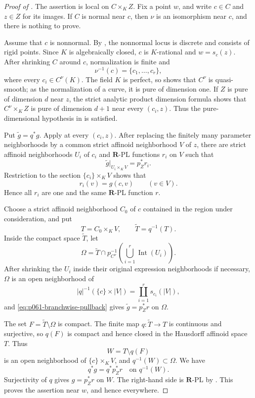 \begin{proof}[Proof of
]
The assertion is local on \(C\times_KZ\).  Fix a point \(w\), and write
\(c\in C\) and \(z\in Z\) for its images.  If \(C\) is normal near
\(c\), then \(\nu\) is an isomorphism near \(c\), and there is nothing
to prove.

Assume that \(c\) is nonnormal.  By
\cite[Lemma~3.9(2)]{GR25Classical}, the nonnormal locus is discrete and
consists of rigid points.  Since \(K\) is algebraically closed, \(c\) is
\(K\)-rational and \(w=s_c(z)\).  After shrinking \(C\) around \(c\),
normalization is finite and
\[
                         \nu^{-1}(c)=\{c_1,\ldots,c_r\},
\]
where every \(c_i\in C^\nu(K)\).
The field \(K\) is perfect, so
\cite[Lemma~3.9(1)]{GR25Classical} shows that \(C^\nu\) is quasi-smooth;
as the normalization of a curve, it is pure of dimension one.  If \(Z\)
is pure of dimension \(d\) near \(z\), the strict analytic product
dimension formula shows that \(C^\nu\times_KZ\) is pure of dimension
\(d+1\) near every \((c_i,z)\).  Thus the pure-dimensional hypothesis in
 is satisfied.

Put \(\widetilde g=q^*g\).  Apply
 at every \((c_i,z)\).  After
replacing the finitely many parameter neighborhoods by a common strict
affinoid neighborhood \(V\) of \(z\), there are strict affinoid
neighborhoods \(U_i\) of \(c_i\) and \(\mathbf R\)-PL functions \(r_i\)
on \(V\) such that
\begin{equation}
\label{eq:p061-branchwise-pullback}
                    \widetilde g|_{U_i\times_KV}=p_Z^*r_i.
\end{equation}
Restriction to the section \(\{c_i\}\times_KV\) shows that
\[
                     r_i(v)=g(c,v)\qquad(v\in V).
\]
Hence all \(r_i\) are one and the same \(\mathbf R\)-PL function \(r\).

Choose a strict affinoid neighborhood \(C_0\) of \(c\) contained in the
region under consideration, and put
\[
 T=C_0\times_KV,\qquad \widetilde T=q^{-1}(T).
\]
Inside the compact space \(\widetilde T\), let
\[
 \Omega=\widetilde T\cap
         p_{C^\nu}^{-1}\!\left(\bigcup_{i=1}^r\operatorname{Int}(U_i)\right).
\]
After shrinking the \(U_i\) inside their original expression
neighborhoods if necessary, \(\Omega\) is an open neighborhood of
\[
 |q|^{-1}(\{c\}\times|V|)
       =\coprod_{i=1}^r s_{c_i}(|V|),
\]
and \eqref{eq:p061-branchwise-pullback} gives
\(\widetilde g=p_Z^*r\) on \(\Omega\).

The set \(F=\widetilde T\setminus\Omega\) is compact.  The finite map
\(q:\widetilde T\to T\) is continuous and surjective, so \(q(F)\) is
compact and hence closed in the Hausdorff affinoid space \(T\).  Thus
\[
                              W=T\setminus q(F)
\]
is an open neighborhood of \(\{c\}\times_KV\), and
\(q^{-1}(W)\subset\Omega\).  We have
\[
                  q^*g=q^*p_Z^*r\quad\text{on }q^{-1}(W).
\]
Surjectivity of \(q\) gives \(g=p_Z^*r\) on \(W\).  The right-hand side
is \(\mathbf R\)-PL by \cite[Lemma~5.4(1)]{GJR26}.  This proves the
assertion near \(w\), and hence everywhere.
\end{proof}


